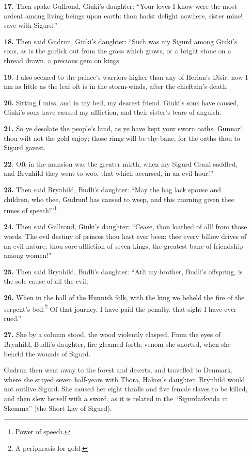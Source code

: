\textbf{17.} Then spake Gullrond, Giuki's daughter: ``Your loves I know were
the most ardent among living beings upon earth: thou hadst delight
nowhere, sister mine! save with Sigurd.''

\textbf{18.} Then said Gudrun, Giuki's daughter: ``Such was my Sigurd among
Giuki's sons, as is the garlick out from the grass which grows, or a
bright stone on a thread drawn, a precious gem on kings.

\textbf{19.} I also seemed to the prince's warriors higher than any of
Herian's Disir; now I am as little as the leaf oft is in the
storm-winds, after the chieftain's death.

\textbf{20.} Sitting I miss, and in my bed, my dearest friend. Giuki's sons
have caused, Giuki's sons have caused my affliction, and their
sister's tears of anguish.

\textbf{21.} So ye desolate the people's land, as ye have kept your sworn
oaths. Gunnar! thou wilt not the gold enjoy; those rings will be thy
bane, for the oaths thou to Sigurd gavest.

\textbf{22.} Oft in the mansion was the greater mirth, when my Sigurd Grani
saddled, and Brynhild they went to woo, that which accursed, in an
evil hour!''

\textbf{23.} Then said Brynhild, Budli's daughter: ``May the hag lack spouse
and children, who thee, Gudrun! has caused to weep, and this morning
given thee runes of speech!''\footnote{Power of speech.}

\textbf{24.} Then said Gullrond, Giuki's daughter: ``Cease, thou loathed of
all! from those words. The evil destiny of princes thou hast ever
been; thee every billow drives of an evil nature; thou sore affliction
of seven kings, the greatest bane of friendship among women!''

\textbf{25.} Then said Brynhild, Budli's daughter: ``Atli my brother, Budli's
offspring, is the sole cause of all the evil;

\textbf{26.} When in the hall of the Hunnish folk, with the king we beheld
the fire of the serpent's bed.\footnote{A periphrasis for gold.} Of that journey, I have paid the
penalty, that sight I have ever rued.''

\textbf{27.} She by a column stood, the wood violently clasped. From the eyes
of Brynhild, Budli's daughter, fire gleamed forth; venom she snorted,
when she beheld the wounds of Sigurd.

Gudrun then went away to the forest and deserts, and travelled to
Denmark, where she stayed seven half-years with Thora, Hakon's
daughter. Brynhild would not outlive Sigurd. She caused her eight
thralls and five female slaves to be killed, and then slew herself
with a sword, as it is related in the ``Sigurdarkvida in Skemma'' (the
Short Lay of Sigurd).

